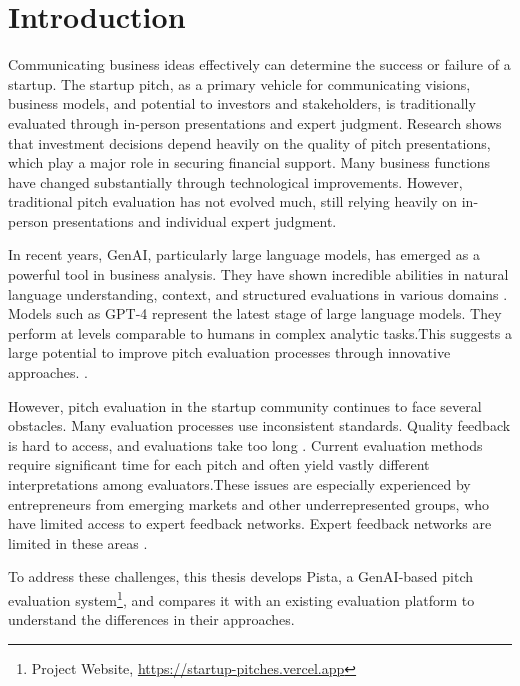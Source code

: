 \chapter{Introduction}

\label{ch:introduction}

Communicating business ideas effectively can determine the success or failure of a startup. The startup pitch, as a primary vehicle for communicating visions, business models, and potential to investors and stakeholders, is traditionally evaluated through in-person presentations and expert judgment.  Research shows that investment decisions depend heavily on the quality of pitch presentations, which play a major role in securing financial support\cite{masterpresentat}. Many business functions have changed substantially through technological improvements. However, traditional pitch evaluation has not evolved much, still relying heavily on in-person presentations and individual expert judgment.



In recent years, GenAI, particularly large language models, has emerged as a powerful tool in business analysis. They have shown incredible abilities in natural language understanding, context, and structured evaluations in various domains \cite{Ozince2024}. Models such as GPT-4 represent the latest stage of large language models. They perform at levels comparable to humans in complex analytic tasks.This suggests a large potential to improve pitch evaluation processes through innovative approaches. \cite{gpt}.



However, pitch evaluation in the startup community continues to face several obstacles. Many evaluation processes use inconsistent standards. Quality feedback is hard to access, and evaluations take too long \cite{StartupEvaluati, Kalvapalle2024}. Current evaluation methods require significant time for each pitch and often yield vastly different interpretations among evaluators.These issues are especially experienced by entrepreneurs from emerging markets and other underrepresented groups, who have limited access to expert feedback networks. Expert feedback networks are limited in these areas \cite{BreakingBarrier}.



To address these challenges, this thesis develops Pista, a GenAI-based pitch evaluation system\footnote{Project Website, \url{https://startup-pitches.vercel.app}}, and compares it with an existing evaluation platform to understand the differences in their approaches.

